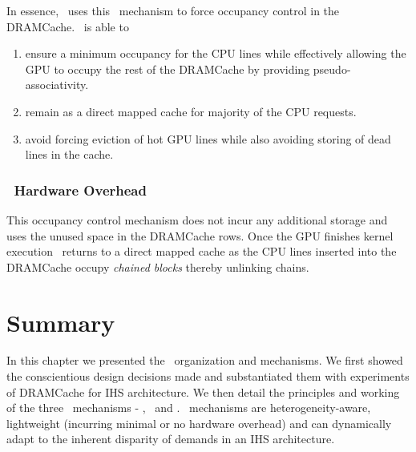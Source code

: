 \par In essence, \cachename\ uses this \chaining\ mechanism to force occupancy control in the DRAMCache. \chaining\ is able to 
\begin{enumerate}[label=(\roman*)]
	\item ensure a minimum occupancy for the CPU lines while effectively allowing the GPU to occupy the rest of the DRAMCache by providing pseudo-associativity.
	\item remain as a direct mapped cache for majority of the CPU requests.
	\item avoid forcing eviction of hot GPU lines while also avoiding storing of dead lines in the cache.
\end{enumerate}

\subsubsection{\chaining\ Hardware Overhead}
This occupancy control mechanism does not incur any additional storage and uses the unused space in the DRAMCache rows. Once the GPU finishes kernel execution \cachename\ returns to a direct mapped cache as the CPU lines inserted into the DRAMCache occupy \textit{chained blocks} thereby unlinking chains. 

\section{Summary}
In this chapter we presented the \cachename\ organization and mechanisms. We first showed the conscientious design decisions made and substantiated them with experiments of DRAMCache for IHS architecture. We then detail the principles and working of the three \cachename\ mechanisms - \prioname, \bypassname\ and \chaining. \cachename\ mechanisms are heterogeneity-aware, lightweight (incurring minimal or no hardware overhead) and can dynamically adapt to the inherent disparity of demands in an IHS architecture.


